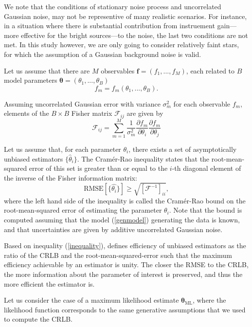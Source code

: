 \documentclass[12pt, preprint]{aastex}
\newcommand{\beq}{\begin{equation}}
\newcommand{\eeq}{\end{equation}}
\begin{document}
We note that the conditions of stationary noise process and uncorrelated Gaussian noise,  may not be representive of many realistic scenarios. 
For instance, in a situation where there is substantial contribution from instruement gain---more effective for the 
bright sources---to the noise, the last two conditions are not met. In this study however, we are only going to consider relatively faint stars, 
for which the assumption of a Gaussian background noise is valid.    


Let us assume that there are $M$ observables $\mathbf{f} = (f_{1}, ... , f_{M})$, each
related to $B$ model parameters $\boldsymbol{\mathbf{\theta}} = (\theta_{1} , ... , \theta_{B})$ 
\beq
f_{m} = f_{m}(\theta_{1} , ... , \theta_{B}).
\label{genmodel}
\eeq

Assuming uncorrelated Gaussian error with variance $\sigma^{2}_{m}$ for each observable $f_{m}$, elements
of the $B\times B$ Fisher matrix $\mathcal{F}_{ij}$ are given by
\beq
\mathcal{F}_{ij} = \sum_{m=1}^{M}\frac{1}{\sigma_{m}^{2}}\frac{\partial f_{m}}{\partial \theta_{i}}\frac{\partial f_{m}}{\partial \theta_{j}}
\label{fisher}
\eeq

Let us assume that, for each parameter $\theta_{i}$, there exists a set of 
asymptotically unbiased estimators $\{\hat{\theta}_{i}\}$. The Cram\'{e}r-Rao inequality 
states that the root-mean-squared error of this set is greater than or equal to 
the $i$-th diagonal element of the inverse of the Fisher information matrix:
\beq
\text{RMSE}[\{\hat{\theta_{i}}\}] \geq \sqrt{[\mathcal{F}^{-1}]_{ii}},
\label{inequality}
\eeq
where the left hand side of the inequality is called the Cram\'{e}r-Rao bound on 
the root-mean-squared error of estimating the parameter $\theta_{i}$. Note that 
the bound is computed assuming that the model (\ref{genmodel}) generating the data 
is known, and that uncertainties are given by additive uncorrelated Gaussian noise.

Based on inequality (\ref{inequality}), \citet{cramer} defines efficiency of unbiased 
estimators as the ratio of the CRLB and the root-mean-squared-error such that the maximum efficiency 
achievable by an estimator is unity. The closer the RMSE to the CRLB, 
the more information about the parameter of interest is preserved, and thus the more efficient 
the estimator is. 

Let us consider the case of a maximum likelihood estimate $\boldsymbol{\mathbf{\theta}}_{\text{ML}}$, 
where the likelihood function corresponds to the same generative assumptions that we used to compute the CRLB.
\end{document}
